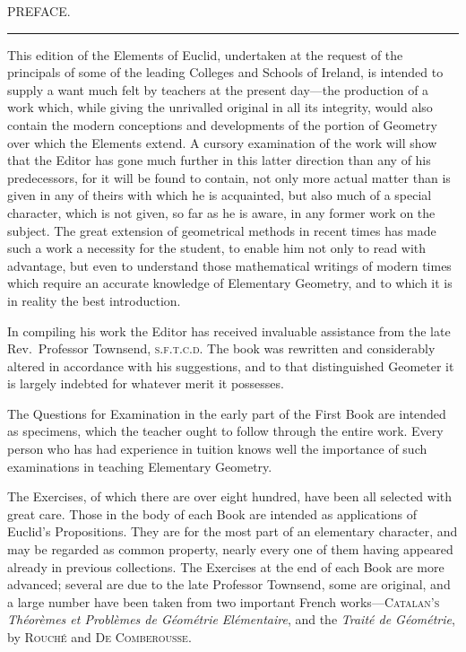 \documentclass[oneside]{book}
\begin{document}
\begin{center}
{\LARGE PREFACE.}

\bigskip

\rule[1ex]{1.5cm}{.2pt}

\bigskip

\end{center}

\noindent This edition of the Elements of Euclid, undertaken
at the request of the principals of some of
the leading Colleges and Schools of Ireland, is
intended to supply a want much felt by teachers
at the present day---the production of a work
which, while giving the unrivalled original in
all its integrity, would also contain the modern
conceptions and developments of the portion of
Geometry over which the Elements extend. A
cursory examination of the work will show that
the Editor has gone much further in this latter
direction than any of his predecessors, for it will
be found to contain, not only more actual matter
than is given in any of theirs with which he is
acquainted, but also much of a special character,
which is not given, so far as he is aware, in any
former work on the subject. The great extension
of geometrical methods in recent times has made
such a work a necessity for the student, to enable
him not only to read with advantage, but even to
understand those mathematical writings of modern
times which require an accurate knowledge
of Elementary Geometry, and to which it is in
reality the best introduction.

In compiling his work the Editor has received
invaluable assistance from the late Rev.\ Professor
Townsend, \textsc{s.f.t.c.d.} The book was rewritten
and considerably altered in accordance with his
suggestions, and to that distinguished Geometer
it is largely indebted for whatever merit it possesses.

The Questions for Examination in the early part
of the First Book are intended as specimens,
which the teacher ought to follow through the
entire work. Every person who has had experience
in tuition knows well the importance
of such examinations in teaching Elementary
Geometry.

The Exercises, of which there are over eight
hundred, have been all selected with great care.
Those in the body of each Book are intended as
applications of Euclid's Propositions. They are
for the most part of an elementary character, and
may be regarded as common property, nearly
every one of them having appeared already in
previous collections. The Exercises at the end
of each Book are more advanced; several are
due to the late Professor Townsend, some are
original, and a large number have been taken
from two important French works---\textsc{Catalan's}
\textit{Théorèmes et Problèmes de Géométrie Elémentaire},
and the \textit{Traité de Géométrie}, by \textsc{Rouché} and
\textsc{De Comberousse}.
\end{document}
